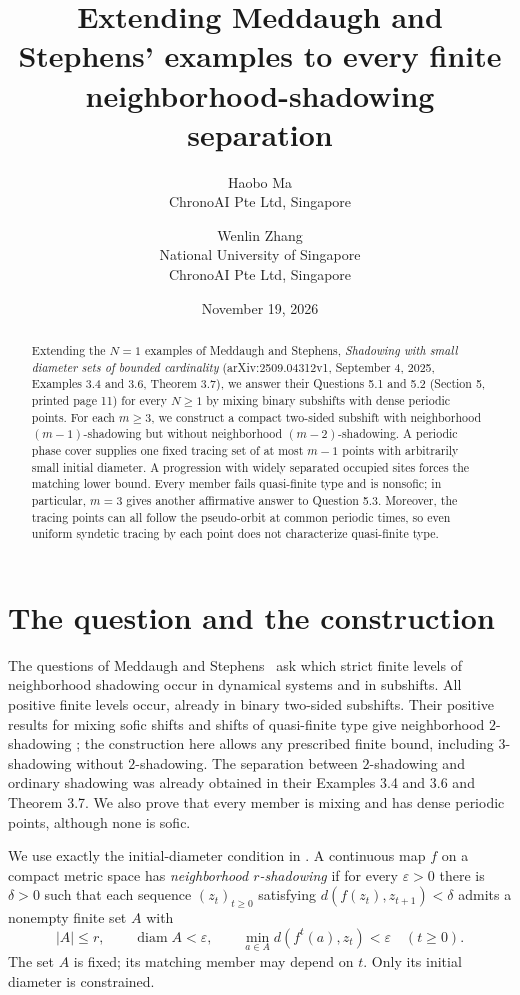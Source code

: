 \documentclass[11pt]{article}
\title{Extending Meddaugh and Stephens' examples to every finite neighborhood-shadowing separation}
\author{Haobo Ma\\\small ChronoAI Pte Ltd, Singapore
\and Wenlin Zhang\\\small National University of Singapore\\\small ChronoAI Pte Ltd, Singapore}
\date{November 19, 2026}
\newcommand{\diam}{\operatorname{diam}}
\begin{document}
\maketitle
\begin{abstract}
Extending the $N=1$ examples of Meddaugh and Stephens,
\emph{Shadowing with small diameter sets of bounded cardinality}
(arXiv:2509.04312v1, September 4, 2025, Examples 3.4 and 3.6,
Theorem 3.7), we answer their Questions 5.1 and 5.2
(Section 5, printed page 11) for every $N\geq1$ by mixing binary
subshifts with dense periodic points.
For each $m\geq3$, we construct a compact two-sided subshift with
neighborhood $(m-1)$-shadowing but without neighborhood $(m-2)$-shadowing.
A periodic phase cover supplies one fixed tracing set of at most $m-1$
points with arbitrarily small initial diameter. A progression with widely
separated occupied sites forces the matching lower bound.
Every member fails quasi-finite type and is nonsofic; in particular,
$m=3$ gives another affirmative answer to Question 5.3.
Moreover, the tracing points can all follow the pseudo-orbit at common
periodic times, so even uniform syndetic tracing by each point does not
characterize quasi-finite type.
\end{abstract}

\section{The question and the construction}
The questions of Meddaugh and Stephens~\cite[Questions 5.1--5.2]{MS}
ask which strict finite levels of neighborhood shadowing occur in dynamical
systems and in subshifts. All positive finite levels occur, already in
binary two-sided subshifts. Their positive results for mixing sofic shifts
and shifts of quasi-finite type give neighborhood $2$-shadowing
\cite[Theorems 3.2 and 3.7]{MS}; the construction here allows any prescribed
finite bound, including $3$-shadowing without $2$-shadowing.
The separation between $2$-shadowing and ordinary shadowing was already
obtained in their Examples 3.4 and 3.6 and Theorem 3.7.
We also prove that every member is mixing and has dense periodic points,
although none is sofic.

We use exactly the initial-diameter condition in
\cite[Definition 2.1]{MS}. A continuous map $f$ on a compact metric space
has \emph{neighborhood $r$-shadowing} if for every $\varepsilon>0$ there
is $\delta>0$ such that each sequence $(z_t)_{t\geq0}$ satisfying
$d(f(z_t),z_{t+1})<\delta$ admits a nonempty finite set $A$ with
\[
 |A|\leq r,\qquad \diam A<\varepsilon,\qquad
 \min_{a\in A}d(f^t(a),z_t)<\varepsilon\quad(t\geq0).
\]
The set $A$ is fixed; its matching member may depend on $t$.
Only its initial diameter is constrained.
\end{document}
